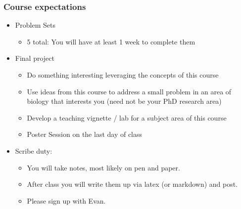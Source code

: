 \documentclass[12pt]{report}
\begin{document}
\subsubsection*{Course expectations}
\label{sec-1-1-2}
\begin{itemize}
\item Problem Sets
\label{sec-1-1-2-1}
\begin{itemize}
\item 5 total: You will have at least 1 week to complete them
\label{sec-1-1-2-1-1}
\end{itemize}
\item Final project
\label{sec-1-1-2-2}
\begin{itemize}
\item Do something interesting leveraging the concepts of this course
\item Use ideas from this course to address a small problem in an area of biology that interests you (need not be your PhD research area)
\item Develop a teaching vignette / lab for a subject area of this course
\item Poster Session on the last day of class
\end{itemize}
\item Scribe duty:
\label{sec-1-1-2-3}
\begin{itemize}
\item You will take notes, most likely on pen and paper.
\item After class you will write them up via latex (or markdown) and post.
\item Please sign up with Evan.
\end{itemize}
\end{itemize}
\end{document}
